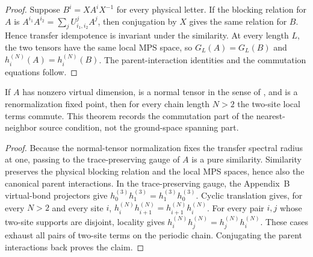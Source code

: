 \begin{proof}\leanok
    Suppose $B^i=XA^iX^{-1}$ for every physical letter. If the blocking
    relation for $A$ is
    $A^{i_1}A^{i_2} =\sum_j U^{j}_{i_1,i_2}A^j$,
    then conjugation by $X$ gives the same relation for $B$. Hence transfer
    idempotence is invariant under the similarity. At every length $L$, the
    two tensors have the same local MPS space, so $G_L(A)=G_L(B)$ and
    $h_i^{(N)}(A)=h_i^{(N)}(B)$. The parent-interaction identities and the
    commutation equations follow.
\end{proof}

\begin{lemma}\label{thm:rfp_implies_nncph}
    \leanok
    If $A$ has nonzero virtual dimension, is a normal tensor in the sense of
    \cite{Cirac2016MPDO_arXiv}, and is a renormalization fixed point, then for
    every chain length $N>2$ the two-site local terms commute. This theorem
    records the commutation part of the nearest-neighbor source condition, not
    the ground-space spanning part.
\end{lemma}

\begin{proof}\leanok
    Because the normal-tensor normalization fixes the transfer spectral radius
    at one, passing to the trace-preserving gauge of $A$ is a pure similarity.
    Similarity preserves the physical blocking relation and the local MPS
    spaces, hence also the canonical parent interactions. In the
    trace-preserving gauge, the Appendix~B virtual-bond projectors give
    $h_0^{(3)}h_1^{(3)} =h_1^{(3)}h_0^{(3)}$.
    Cyclic translation gives, for every $N>2$ and every site $i$,
    $h_i^{(N)}h_{i+1}^{(N)} =h_{i+1}^{(N)}h_i^{(N)}$.
    For every pair $i,j$ whose two-site supports are disjoint, locality gives
    $h_i^{(N)}h_j^{(N)} =h_j^{(N)}h_i^{(N)}$.
    These cases exhaust all pairs of two-site terms on the periodic chain.
    Conjugating the parent interactions back proves the claim.
\end{proof}

